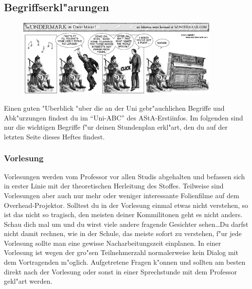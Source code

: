 \subsection{Begriffserkl"arungen}

\begin{figure}[b]
	\centering\includegraphics[width=0.9\textwidth]{bilder/comics/wondermark003.png}
\end{figure}


Einen guten "Uberblick "uber die an der Uni gebr"auchlichen Begriffe und
Abk"urzungen findest du im "`Uni-ABC"' des AStA-Erstiinfos. Im folgenden
sind nur die wichtigen Begriffe f"ur deinen Stundenplan erkl"art, den du
auf der letzten Seite dieses Heftes findest.


\subsubsection*{Vorlesung}

Vorlesungen werden vom Professor vor allen Studis abgehalten und befassen
sich in erster Linie mit der theoretischen Herleitung des Stoffes. Teilweise
sind Vorlesungen aber auch nur mehr oder weniger interessante Folienfilme auf
dem Overhead-Projektor. Solltest du in der Vorlesung einmal etwas nicht
verstehen, so ist das nicht so tragisch, den meisten deiner Kommilitonen geht
es nicht anders. Schau dich mal um und du wirst viele andere fragende Gesichter
sehen\ldots Du darfst nicht damit rechnen, wie in der Schule, das meiste sofort zu
verstehen, f"ur jede Vorlesung sollte man eine gewisse Nacharbeitungszeit
einplanen. In einer Vorlesung ist wegen der gro"sen Teilnehmerzahl
normalerweise kein Dialog mit dem Vortragenden m"oglich. Aufgetretene Fragen
k"onnen und sollten am besten direkt nach der Vorlesung oder sonst in einer
Sprechstunde mit dem Professor gekl"art werden.


